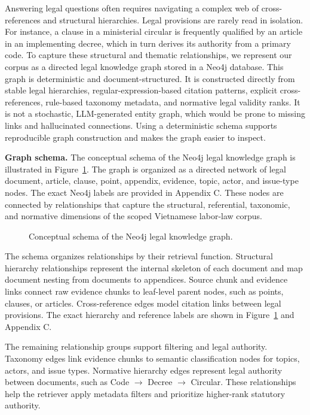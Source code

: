 Answering legal questions often requires navigating a complex web of cross-references and structural hierarchies. Legal provisions are rarely read in isolation. For instance, a clause in a ministerial circular is frequently qualified by an article in an implementing decree, which in turn derives its authority from a primary code. To capture these structural and thematic relationships, we represent our corpus as a directed legal knowledge graph stored in a Neo4j database. This graph is deterministic and document-structured. It is constructed directly from stable legal hierarchies, regular-expression-based citation patterns, explicit cross-references, rule-based taxonomy metadata, and normative legal validity ranks. It is not a stochastic, LLM-generated entity graph, which would be prone to missing links and hallucinated connections. Using a deterministic schema supports reproducible graph construction and makes the graph easier to inspect.

\textbf{Graph schema.} The conceptual schema of the Neo4j legal knowledge graph is illustrated in Figure~\ref{fig:legal-graph-schema}. The graph is organized as a directed network of legal document, article, clause, point, appendix, evidence, topic, actor, and issue-type nodes. The exact Neo4j labels are provided in Appendix C. These nodes are connected by relationships that capture the structural, referential, taxonomic, and normative dimensions of the scoped Vietnamese labor-law corpus.

\begin{figure}[t!]
  \centering
  \resizebox{0.95\textwidth}{!}{}
  \caption{Conceptual schema of the Neo4j legal knowledge graph.}
  \label{fig:legal-graph-schema}
\end{figure}
\FloatBarrier

The schema organizes relationships by their retrieval function. Structural hierarchy relationships represent the internal skeleton of each document and map document nesting from documents to appendices. Source chunk and evidence links connect raw evidence chunks to leaf-level parent nodes, such as points, clauses, or articles. Cross-reference edges model citation links between legal provisions. The exact hierarchy and reference labels are shown in Figure~\ref{fig:legal-graph-schema} and Appendix C.

The remaining relationship groups support filtering and legal authority. Taxonomy edges link evidence chunks to semantic classification nodes for topics, actors, and issue types. Normative hierarchy edges represent legal authority between documents, such as Code $\rightarrow$ Decree $\rightarrow$ Circular. These relationships help the retriever apply metadata filters and prioritize higher-rank statutory authority.

